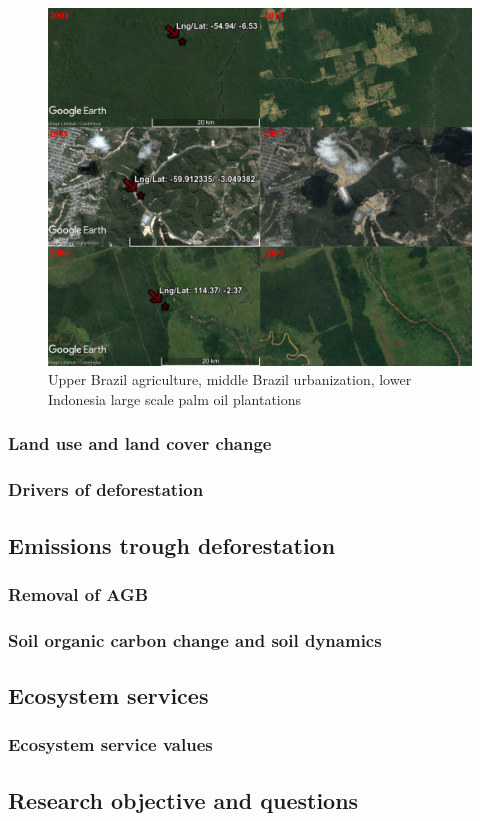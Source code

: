 	\begin{figure}[ht]
		\centering
		\includegraphics[scale=0.6]{img/deforestation_examples}
		\caption[Deforestation examples]{Upper Brazil agriculture, middle Brazil urbanization, lower Indonesia large scale palm oil plantations}
		\label{fig:deforestationexamples}
	\end{figure}

	\subsubsection{Land use and land cover change}
	\subsubsection{Drivers of deforestation}
	\subsection{Emissions trough deforestation}
	\subsubsection{Removal of AGB}
	\subsubsection{Soil organic carbon change and soil dynamics}

\subsection{Ecosystem services}
\label{subsec:ecosystem_services}

	\subsubsection{Ecosystem service values}
	\subsection{Research objective and questions}

